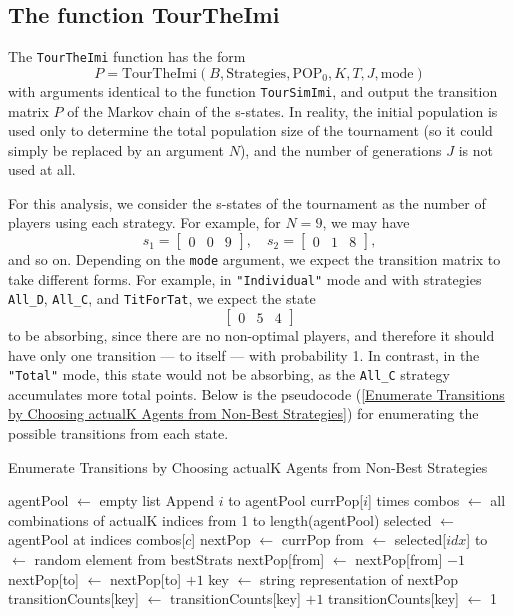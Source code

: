 \subsection{The function TourTheImi}
The \texttt{TourTheImi} function has the form
\[
P = \text{TourTheImi}(B, \text{Strategies}, \text{POP}_0, K, T, J, \text{mode})
\]
with arguments identical to the function \texttt{TourSimImi}, and output the transition matrix \( P \) of the Markov chain of the s-states. In reality, the initial population is used only to determine the total population size of the tournament (so it could simply be replaced by an argument \( N \)), and the number of generations \( J \) is not used at all.

For this analysis, we consider the s-states of the tournament as the number of players using each strategy. For example, for \( N = 9 \), we may have
\[
s_1 = \begin{bmatrix} 0 & 0 & 9 \end{bmatrix}, \quad s_2 = \begin{bmatrix} 0 & 1 & 8 \end{bmatrix},
\]
and so on. Depending on the \texttt{mode} argument, we expect the transition matrix to take different forms. For example, in \texttt{"Individual"} mode and with strategies \texttt{All\_D}, \texttt{All\_C}, and \texttt{TitForTat}, we expect the state
\[
\begin{bmatrix} 0 & 5 & 4 \end{bmatrix}
\]
to be absorbing, since there are no non-optimal players, and therefore it should have only one transition — to itself — with probability 1. In contrast, in the \texttt{"Total"} mode, this state would not be absorbing, as the \texttt{All\_C} strategy accumulates more total points. Below is the pseudocode (\ref{Enumerate Transitions by Choosing actualK Agents from Non-Best Strategies}) for enumerating the possible transitions from each state.

\begin{algorithm}
\caption{Enumerate Transitions by Choosing actualK Agents from Non-Best Strategies}
\label{Enumerate Transitions by Choosing actualK Agents from Non-Best Strategies}
\begin{algorithmic}[1]
\STATE agentPool $\leftarrow$ empty list
    \STATE Append $i$ to agentPool currPop[$i$] times
\ENDFOR
\STATE combos $\leftarrow$ all combinations of actualK indices from 1 to length(agentPool)
    \STATE selected $\leftarrow$ agentPool at indices combos[$c$]
    \STATE nextPop $\leftarrow$ currPop
        \STATE from $\leftarrow$ selected[$idx$]
        \STATE to $\leftarrow$ random element from bestStrats
        \STATE nextPop[from] $\leftarrow$ nextPop[from] $- 1$
        \STATE nextPop[to] $\leftarrow$ nextPop[to] $+ 1$
    \ENDFOR
    \STATE key $\leftarrow$ string representation of nextPop
        \STATE transitionCounts[key] $\leftarrow$ transitionCounts[key] $+ 1$
    \ELSE
        \STATE transitionCounts[key] $\leftarrow$ 1
    \ENDIF
\ENDFOR
\end{algorithmic}
\end{algorithm}

